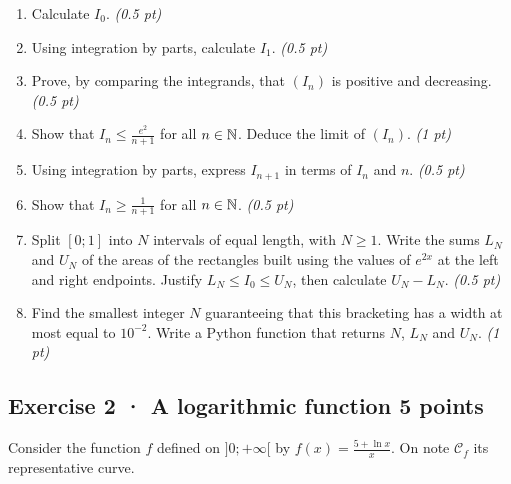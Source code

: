\begin{enumerate}

\item Calculate $I_0$. \hfill\textit{(0.5 pt)}

\item Using integration by parts, calculate $I_1$. \hfill\textit{(0.5 pt)}

\item Prove, by comparing the integrands, that $(I_n)$ is positive and decreasing. \hfill\textit{(0.5 pt)}

\item Show that $I_n\le\frac{e^{2}}{n+1}$ for all $n\in\mathbb N$. Deduce the limit of $(I_n)$. \hfill\textit{(1 pt)}

\item Using integration by parts, express $I_{n+1}$ in terms of $I_n$ and $n$. \hfill\textit{(0.5 pt)}

\item Show that $I_n\ge\frac1{n+1}$ for all $n\in\mathbb N$. \hfill\textit{(0.5 pt)}

\item Split $[0;1]$ into $N$ intervals of equal length, with $N\ge1$. Write the sums $L_N$ and $U_N$ of the areas of the rectangles built using the values of $e^{2x}$ at the left and right endpoints. Justify $L_N\le I_0\le U_N$, then calculate $U_N-L_N$. \hfill\textit{(0.5 pt)}

\item Find the smallest integer $N$ guaranteeing that this bracketing has a width at most equal to $10^{-2}$. Write a Python function that returns $N$, $L_N$ and $U_N$. \hfill\textit{(1 pt)}

\end{enumerate}

\subsection*{Exercise 2 · A logarithmic function \hfill 5 points}Consider the function $f$ defined on $]0;+\infty[$ by $f(x)=\frac{5+\ln x}x$. On note $\mathcal C_f$ its representative curve.


